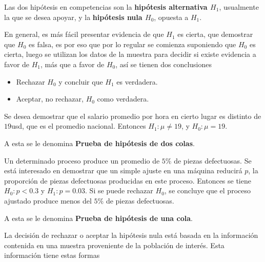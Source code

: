 \begin{Def}
Las dos hip\'otesis en competencias son la \textbf{hip\'otesis alternativa $H_{1}$}, usualmente la que se desea apoyar, y la \textbf{hip\'otesis nula $H_{0}$}, opuesta a $H_{1}$.
\end{Def}








En general, es m\'as f\'acil presentar evidencia de que $H_{1}$ es cierta, que demostrar 	que $H_{0}$ es falsa, es por eso que por lo regular se comienza suponiendo que $H_{0}$ es cierta, luego se utilizan los datos de la muestra para decidir si existe evidencia a favor de $H_{1}$, m\'as que a favor de $H_{0}$, as\'i se tienen dos conclusiones
\begin{itemize}
\item Rechazar $H_{0}$ y concluir que $H_{1}$ es verdadera.
\item Aceptar, no rechazar, $H_{0}$ como verdadera.

\end{itemize}

\begin{Ejem}
Se desea demostrar que el salario promedio  por hora en cierto lugar es distinto de $19$usd, que es el promedio nacional. Entonces $H_{1}:\mu\neq19$, y $H_{0}:\mu=19$.
\end{Ejem}
A esta se le denomina \textbf{Prueba de hip\'otesis de dos colas}.






\begin{Ejem}
Un determinado proceso produce un promedio de $5\%$ de piezas defectuosas. Se est\'a interesado en demostrar que un simple ajuste en una m\'aquina reducir\'a $p$, la proporci\'on de piezas defectuosas producidas en este proceso. Entonces se tiene $H_{0}:p<0.3$ y $H_{1}:p=0.03$. Si se puede rechazar $H_{0}$, se concluye que el proceso ajustado produce menos del $5\%$ de piezas defectuosas.
\end{Ejem}
A esta se le denomina \textbf{Prueba de hip\'otesis de una cola}.


La decisi\'on de rechazar o aceptar la hip\'otesis nula est\'a basada en la informaci\'on contenida en una muestra proveniente de la poblaci\'on de inter\'es. Esta informaci\'on tiene estas formas

